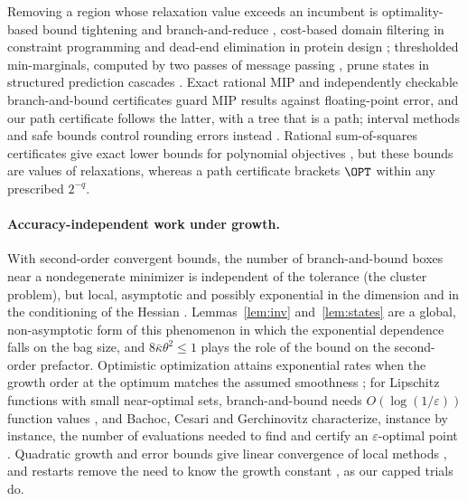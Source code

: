 Removing a region whose relaxation value exceeds an incumbent is
optimality-based bound tightening and branch-and-reduce
\cite{RyooSahinidis1996,BelottiEtAl2009,GleixnerEtAl2017,PuranikSahinidis2017},
cost-based domain filtering in constraint programming
\cite{FocacciLodiMilano1999} and dead-end elimination in protein design
\cite{DesmetEtAl1992,GainzaRobertsDonald2012}; thresholded min-marginals,
computed by two passes of message passing
\cite{Dawid1992,AjiMcEliece2000,WainwrightJaakkolaWillsky2005,KohliTorr2006},
prune states in structured prediction cascades \cite{WeissTaskar2010}. Exact
rational MIP \cite{CookKochSteffyWolter2013,EiflerGleixner2023} and
independently checkable branch-and-bound certificates
\cite{CheungGleixnerSteffy2017} guard MIP results against floating-point
error, and our path certificate follows the latter, with a tree that is a
path; interval methods and safe bounds control rounding errors instead
\cite{Hansen1980,HansenWalster2004,NeumaierShcherbina2004}. Rational
sum-of-squares certificates give exact lower bounds for polynomial objectives
\cite{PeyrlParrilo2008,KaltofenEtAl2008}, but these bounds are values of
relaxations, whereas a path certificate brackets $\OPT$ within any prescribed
$2^{-q}$.

\paragraph{Accuracy-independent work under growth.}
With second-order convergent bounds, the number of branch-and-bound boxes
near a nondegenerate minimizer is independent of the tolerance (the cluster
problem), but local, asymptotic and possibly exponential in the dimension
and in the conditioning of the Hessian
\cite{DuKearfott1994,Neumaier2004,WechsungSchaberBarton2014,KannanBarton2017}.
Lemmas~\ref{lem:inv} and~\ref{lem:states} are a global, non-asymptotic form of
this phenomenon in which the exponential dependence falls on the bag size,
and $8\bar\kappa\theta^2\le1$ plays the role of the bound on the second-order
prefactor. Optimistic optimization attains exponential rates when the growth
order at the optimum matches the assumed smoothness \cite{Munos2011}; for
Lipschitz functions with small near-optimal sets, branch-and-bound needs
$O(\log(1/\varepsilon))$ function values \cite{Perevozchikov1990}, and
Bachoc, Cesari and Gerchinovitz characterize, instance by instance, the
number of evaluations needed to find and certify an $\varepsilon$-optimal
point \cite{BachocCesariGerchinovitz2021}. Quadratic growth and error bounds
give linear convergence of local methods
\cite{LuoTseng1993,KarimiNutiniSchmidt2016,DrusvyatskiyLewis2018,
NecoaraNesterovGlineur2019}, and restarts remove the need to know the growth
constant \cite{RouletDAspremont2020}, as our capped trials do.

